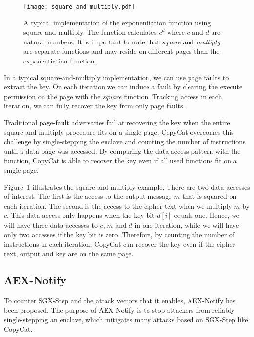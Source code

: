 \documentclass{llncs}
\begin{document}
\begin{figure}[t]
  \centering
  \texttt{[image: square-and-multiply.pdf]}
  \caption{A typical implementation of the exponentiation function using square and multiply.
    The function calculates $c^d$ where $c$ and $d$ are natural numbers.
    It is important to note that \emph{square} and \emph{multiply} are separate functions
    and may reside on different pages than the exponentiation function.}
  \label{fig:square-and-multiply}
\end{figure}

In a typical square-and-multiply implementation,
we can use page faults to extract the key.
On each iteration we can induce a fault by clearing the execute permission on
the page with the \emph{square} function.
Tracking access in each iteration, we can fully recover the key from only page faults.

Traditional page-fault adversaries fail at recovering the key when the entire
square-and-multiply procedure fits on a single page.
CopyCat overcomes this challenge by single-stepping the enclave and counting the
number of instructions until a data page was accessed.
By comparing the data access pattern with the function, CopyCat is able to recover the key
even if all used functions fit on a single page.

Figure~\ref{fig:square-and-multiply} illustrates the square-and-multiply example.
There are two data accesses of interest.
The first is the access to the output message $m$ that is squared on each iteration.
The second is the access to the cipher text when we multiply $m$ by $c$.
This data access only happens when the key bit $d[i]$ equals one.
Hence, we will have three data accesses to $c$, $m$ and $d$ in one iteration,
while we will have only two accesses if the key bit is zero.
Therefore, by counting the number of instructions in each iteration,
CopyCat can recover the key even if the cipher text, output and key are on the same page.


\subsection{AEX-Notify}
\label{sec:aex-notify}

To counter SGX-Step and the attack vectors that it enables, AEX-Notify has been proposed.
The purpose of AEX-Notify is to stop attackers from reliably single-stepping an enclave,
which mitigates many attacks based on SGX-Step like CopyCat.
\end{document}

